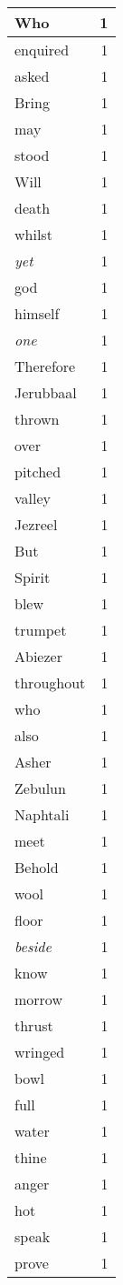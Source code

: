 \begin{center}
\begin{longtable}{l|r}
Who & 1\\ \hline 
enquired & 1\\ \hline 
asked & 1\\ \hline 
Bring & 1\\ \hline 
may & 1\\ \hline 
stood & 1\\ \hline 
Will & 1\\ \hline 
death & 1\\ \hline 
whilst & 1\\ \hline 
\emph{yet} & 1\\ \hline 
god & 1\\ \hline 
himself & 1\\ \hline 
\emph{one} & 1\\ \hline 
Therefore & 1\\ \hline 
Jerubbaal & 1\\ \hline 
thrown & 1\\ \hline 
over & 1\\ \hline 
pitched & 1\\ \hline 
valley & 1\\ \hline 
Jezreel & 1\\ \hline 
But & 1\\ \hline 
Spirit & 1\\ \hline 
blew & 1\\ \hline 
trumpet & 1\\ \hline 
Abiezer & 1\\ \hline 
throughout & 1\\ \hline 
who & 1\\ \hline 
also & 1\\ \hline 
Asher & 1\\ \hline 
Zebulun & 1\\ \hline 
Naphtali & 1\\ \hline 
meet & 1\\ \hline 
Behold & 1\\ \hline 
wool & 1\\ \hline 
floor & 1\\ \hline 
\emph{beside} & 1\\ \hline 
know & 1\\ \hline 
morrow & 1\\ \hline 
thrust & 1\\ \hline 
wringed & 1\\ \hline 
bowl & 1\\ \hline 
full & 1\\ \hline 
water & 1\\ \hline 
thine & 1\\ \hline 
anger & 1\\ \hline 
hot & 1\\ \hline 
speak & 1\\ \hline 
prove & 1\\ \hline 
\end{longtable}
\end{center}



